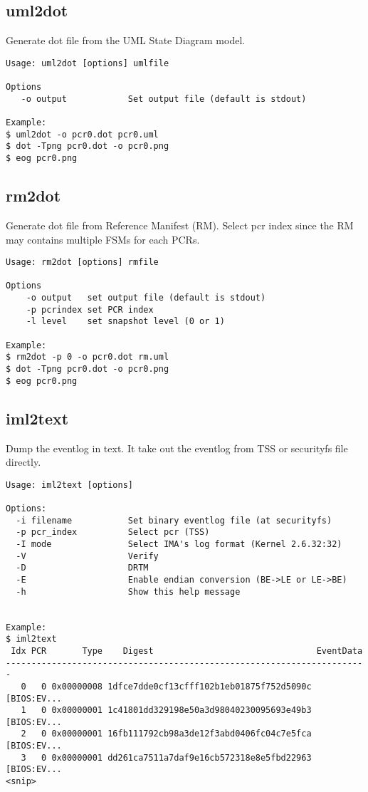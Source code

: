 \subsection{uml2dot} 

Generate dot file from the UML State Diagram model.

\begin{lstlisting}[style=help_message]
Usage: uml2dot [options] umlfile

Options
   -o output	        Set output file (default is stdout)

Example:
$ uml2dot -o pcr0.dot pcr0.uml
$ dot -Tpng pcr0.dot -o pcr0.png
$ eog pcr0.png
\end{lstlisting}

\subsection{rm2dot} 

Generate dot file from Reference Manifest (RM).
Select pcr index since the RM may contains multiple FSMs for each PCRs. 

\begin{lstlisting}[style=help_message]
Usage: rm2dot [options] rmfile

Options
	-o output	set output file (default is stdout)
	-p pcrindex	set PCR index
	-l level	set snapshot level (0 or 1)

Example:
$ rm2dot -p 0 -o pcr0.dot rm.uml
$ dot -Tpng pcr0.dot -o pcr0.png
$ eog pcr0.png
\end{lstlisting}

\subsection{iml2text} 

Dump the eventlog in text.
It take out the eventlog from TSS or securityfs file directly.

\begin{lstlisting}[style=help_message]
Usage: iml2text [options]

Options:
  -i filename           Set binary eventlog file (at securityfs)
  -p pcr_index          Select pcr (TSS)
  -I mode               Select IMA's log format (Kernel 2.6.32:32)
  -V                    Verify
  -D                    DRTM
  -E                    Enable endian conversion (BE->LE or LE->BE)
  -h                    Show this help message


Example:
$ iml2text
 Idx PCR       Type    Digest                                EventData
-----------------------------------------------------------------------
   0   0 0x00000008 1dfce7dde0cf13cfff102b1eb01875f752d5090c [BIOS:EV...
   1   0 0x00000001 1c41801dd329198e50a3d98040230095693e49b3 [BIOS:EV...
   2   0 0x00000001 16fb111792cb98a3de12f3abd0406fc04c7e5fca [BIOS:EV...
   3   0 0x00000001 dd261ca7511a7daf9e16cb572318e8e5fbd22963 [BIOS:EV...
<snip>
\end{lstlisting}

